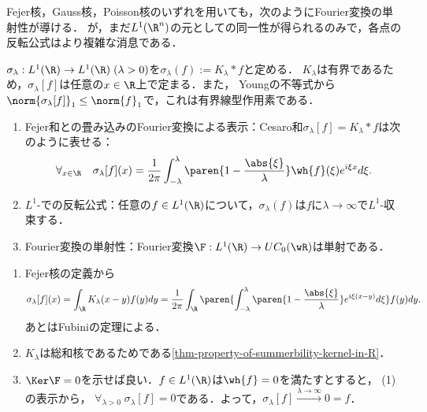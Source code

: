 \documentclass[uplatex,dvipdfmx]{jsreport}
\begin{document}
\begin{tcolorbox}[colframe=ForestGreen, colback=ForestGreen!10!white,breakable,colbacktitle=ForestGreen!40!white,coltitle=black,fonttitle=\bfseries\sffamily,
title=]
    Fejer核，Gauss核，Poisson核のいずれを用いても，次のようにFourier変換の単射性が導ける．
    が，まだ$L^1(\R^n)$の元としての同一性が得られるのみで，各点の反転公式はより複雑な消息である．
\end{tcolorbox}

\begin{definition}[Cesaro和]
    $\sigma_\lambda:L^1(\R)\to L^1(\R)\;(\lambda>0)$を$\sigma_\lambda(f):=K_\lambda*f$と定める．
    $K_\lambda$は有界であるため，$\sigma_\lambda[f]$は任意の$x\in\R$上で定まる．また，
    Youngの不等式から$\norm{\sigma_\lambda[f]}_1\le\norm{f}_1$で，これは有界線型作用素である．
\end{definition}

\begin{corollary}[Fourier変換の単射性]\mbox{}\label{cor-expression-of-Cesaro-sum}
    \begin{enumerate}
        \item Fejer和との畳み込みのFourier変換による表示：Cesaro和$\sigma_\lambda[f]=K_\lambda*f$は次のように表せる：
        \[\forall_{x\in\R}\quad \sigma_\lambda[f](x)=\frac{1}{2\pi}\int^\lambda_{-\lambda}\paren{1-\frac{\abs{\xi}}{\lambda}}\wh{f}(\xi)e^{i\xi x}d\xi.\]
        \item $L^1$-での反転公式：任意の$f\in L^1(\R)$について，$\sigma_\lambda(f)$は$f$に$\lambda\to\infty$で$L^1$-収束する．
        \item Fourier変換の単射性：Fourier変換$\F:L^1(\R)\to UC_0(\wR)$は単射である．
    \end{enumerate}
\end{corollary}
\begin{Proof}\mbox{}
    \begin{enumerate}
        \item Fejer核の定義から
        \[\sigma_\lambda[f](x)=\int_\R K_\lambda(x-y)f(y)dy=\frac{1}{2\pi}\int_\R\paren{\int^\lambda_{-\lambda}\paren{1-\frac{\abs{\xi}}{\lambda}}e^{i\xi(x-y)}d\xi}f(y)dy.\]
        あとはFubiniの定理による．
        \item $K_\lambda$は総和核であるためである\ref{thm-property-of-summerbility-kernel-in-R}．
        \item $\Ker\F=0$を示せば良い．$f\in L^1(\R)$は$\wh{f}=0$を満たすとすると，
        (1)の表示から，
        $\forall_{\lambda>0}\;\sigma_\lambda[f]=0$である．よって，$\sigma_\lambda[f]\xrightarrow{\lambda\to\infty}0=f$．
    \end{enumerate}
\end{Proof}
\end{document}
